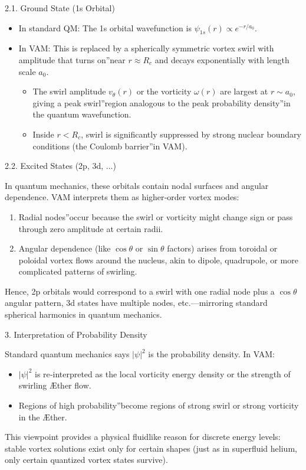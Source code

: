 2.1. Ground State (1s Orbital)

\begin{itemize}
    \item In standard QM: The 1s orbital wavefunction is \(\psi_{1s}(r) \propto e^{-r/a_0}\).
    \item In VAM: This is replaced by a spherically symmetric vortex swirl with amplitude that \grqq turns on\textquotedblright near \(r \approx R_c\) and decays exponentially with length scale \(a_0\).
        \begin{itemize}
        \item The swirl amplitude \(v_\theta(r)\) or the vorticity \(\omega(r)\) are largest at \(r \sim a_0\), giving a \grqq peak swirl\textquotedblright region analogous to the \grqq peak probability density\textquotedblright in the quantum wavefunction.
        \item Inside \(r < R_c\), swirl is significantly suppressed by strong nuclear boundary conditions (the \grqq Coulomb barrier\textquotedblright in VAM).
        \end{itemize}
\end{itemize}




2.2. Excited States (2p, 3d, ...)

In quantum mechanics, these orbitals contain nodal surfaces and angular dependence. VAM interprets them as higher‐order vortex modes:

\begin{enumerate}
\item Radial \grqq nodes\textquotedblright occur because the swirl or vorticity might change sign or pass through zero amplitude at certain radii.
\item Angular dependence (like \(\cos\theta\) or \(\sin\theta\) factors) arises from toroidal or poloidal vortex flows around the nucleus, akin to dipole, quadrupole, or more complicated patterns of swirling.
\end{enumerate}
Hence, 2p orbitals would correspond to a swirl with one radial node plus a \(\cos\theta\) angular pattern, 3d states have multiple nodes, etc.—mirroring standard spherical harmonics in quantum mechanics.


3. Interpretation of Probability Density

Standard quantum mechanics says \(|\psi|^2\) is the probability density. In VAM:

\begin{itemize}
\item \(|\psi|^2\) is re‐interpreted as the local vorticity energy density or the strength of swirling Æther flow.
\item Regions of \grqq high probability\textquotedblright become regions of strong swirl or strong vorticity in the Æther.
\end{itemize}
This viewpoint provides a physical fluidlike reason for discrete energy levels: stable vortex solutions exist only for certain shapes (just as in superfluid helium, only certain quantized vortex states survive).

